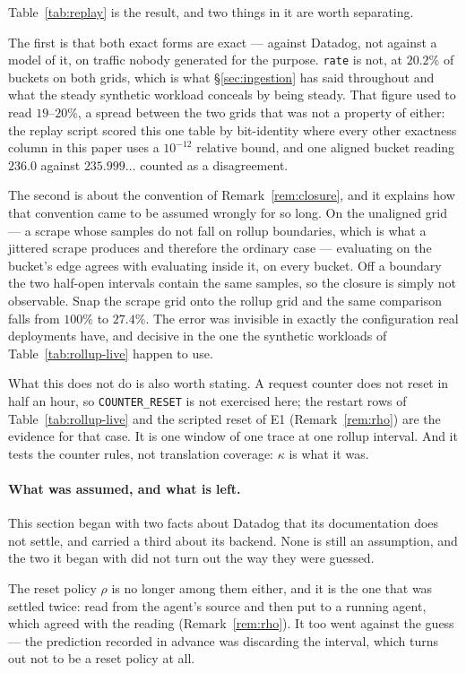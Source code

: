 Table~\ref{tab:replay} is the result, and two things in it are worth separating.

The first is that both exact forms are exact --- against Datadog, not against a model of
it, on traffic nobody generated for the purpose. \texttt{rate} is not, at $20.2\%$ of
buckets on both grids, which is what \S\ref{sec:ingestion} has said throughout and what
the steady synthetic workload conceals by being steady. That figure used to read
$19$--$20\%$, a spread between the two grids that was not a property of either: the
replay script scored this one table by bit-identity where every other exactness column in
this paper uses a $10^{-12}$ relative bound, and one aligned bucket reading $236.0$
against $235.999\ldots$ counted as a disagreement.

The second is about the convention of Remark~\ref{rem:closure}, and it explains how that
convention came to be assumed wrongly for so long. On the unaligned grid --- a scrape
whose samples do not fall on rollup boundaries, which is what a jittered scrape produces
and therefore the ordinary case --- evaluating on the bucket's edge agrees with
evaluating inside it, on every bucket. Off a boundary the two half-open intervals contain
the same samples, so the closure is simply not observable. Snap the scrape grid onto the
rollup grid and the same comparison falls from $100\%$ to $27.4\%$. The error was
invisible in exactly the configuration real deployments have, and decisive in the one the
synthetic workloads of Table~\ref{tab:rollup-live} happen to use.

What this does not do is also worth stating. A request counter does not reset in half an
hour, so \texttt{COUNTER\_RESET} is not exercised here; the restart rows of
Table~\ref{tab:rollup-live} and the scripted reset of E1 (Remark~\ref{rem:rho}) are the
evidence for that case. It is one window of one
trace at one rollup interval. And it tests the counter rules, not translation coverage:
$\kappa$ is what it was.

\paragraph{What was assumed, and what is left.}
This section began with two facts about Datadog that its documentation does not settle,
and carried a third about its backend. None is still an assumption, and the two it began
with did not turn out the way they were guessed.

The reset policy $\rho$ is no longer among them either, and it is the one that was
settled twice: read from the agent's source and then put to a running agent, which
agreed with the reading (Remark~\ref{rem:rho}). It too went against the guess --- the
prediction recorded in advance was discarding the interval, which turns out not to be a
reset policy at all.

